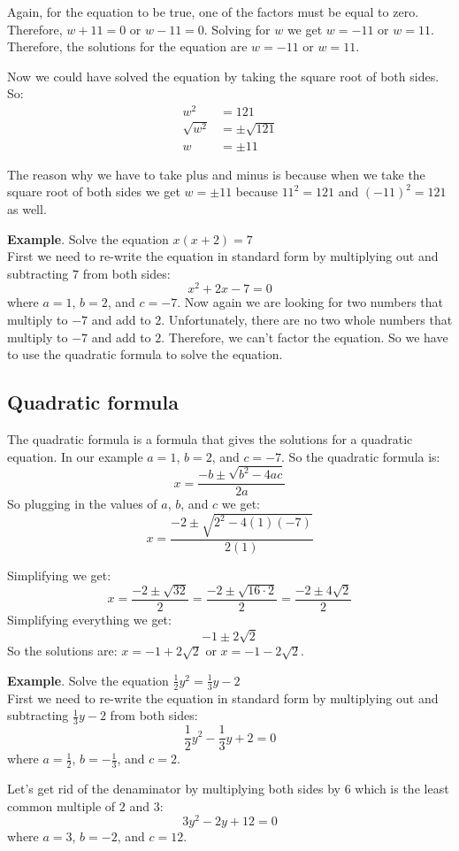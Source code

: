 Again, for the equation to be true, one of the factors must be equal to zero. Therefore, $w+11=0$ or $w-11=0$. Solving for $w$ we get $w=-11$ or $w=11$. Therefore, the solutions for the equation are $w=-11$ or $w=11$.

Now we could have solved the equation by taking the square root of both sides. So:
\begin{align*}
    w^2&=121 \\
    \sqrt{w^2}&=\pm \sqrt{121} \\
    w&=\pm 11
\end{align*}

The reason why we have to take plus and minus is because when we take the square root of both sides we get $w=\pm 11$ because $11^2=121$ and $(-11)^2=121$ as well.

\textbf{Example}. Solve the equation $x(x+2) = 7$
\\
First we need to re-write the equation in standard form by multiplying out and subtracting $7$ from both sides:
$$x^2+2x-7=0$$ where $a=1$, $b=2$, and $c=-7$.
Now again we are looking for two numbers that multiply to $-7$ and add to $2$. Unfortunately, there are no two whole numbers that multiply to $-7$ and add to $2$. Therefore, we can't factor the equation. So we have to use the quadratic formula to solve the equation.
\subsection{Quadratic formula}
The quadratic formula is a formula that gives the solutions for a quadratic equation. In our example $a = 1$, $b = 2$, and $c = -7$. So the quadratic formula is:
$$x=\frac{-b \pm \sqrt{b^2-4ac}}{2a}$$
So plugging in the values of $a$, $b$, and $c$ we get:
$$x=\frac{-2 \pm \sqrt{2^2-4(1)(-7)}}{2(1)}$$

Simplifying we get:
$$x=\frac{-2 \pm \sqrt{32}}{2} = \frac{-2\pm\sqrt{16\cdot2}}{2} = \frac{-2\pm4\sqrt{2}}{2} $$
Simplifying everything we get: 
$$ -1\pm2\sqrt{2} $$
So the solutions are: $x=-1+2\sqrt{2}$ or $x=-1-2\sqrt{2}$.

\textbf{Example}. Solve the equation $\frac{1}{2}y^2 = \frac{1}{3}y-2$ \\

First we need to re-write the equation in standard form by multiplying out and subtracting $\frac{1}{3}y-2$ from both sides:
$$\frac{1}{2}y^2-\frac{1}{3}y+2=0$$ where $a=\frac{1}{2}$, $b=-\frac{1}{3}$, and $c=2$.

Let's get rid of the denaminator by multiplying both sides by $6$ which is the least common multiple of $2$ and $3$:
$$3y^2-2y+12=0$$ where $a=3$, $b=-2$, and $c=12$.

